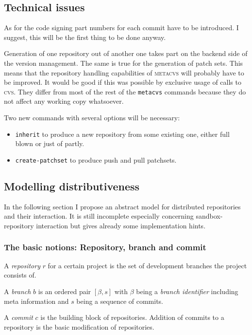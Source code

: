 \documentclass[fleqn, 10pt, a4paper]{article}
\begin{document}
\subsection{Technical issues}

As for the code signing part numbers for each commit have
to be introduced. I suggest, this will be the first thing to be done anyway.

Generation of one repository out of another one takes part on the backend
side of the version management. The same is true for the generation
of patch sets. This means that the repository handling capabilities of
\textsc{metacvs} will probably have to be improved. It would be good if
this was possible by exclusive usage of calls to \textsc{cvs}.
They differ from most of the rest of the \texttt{metacvs} commands
because they do not affect any working copy whatsoever.

Two new commands with several options will be necessary:
\begin{itemize}
\item \texttt{inherit} to produce a new repository from some existing one,
either full blown or just of partly.
\item \texttt{create-patchset} to produce push and pull patchsets.
\end{itemize}

\subsection{Modelling distributiveness}

In the following section I propose an abstract model for distributed
repositories and their interaction. It is still incomplete
especially concerning sandbox-repository interaction but gives already
some implementation hints.

\subsubsection{The basic notions: Repository, branch and commit}

A \emph{repository} $r$ for a certain project is the set of development
branches the project consists of.

A \emph{branch} $b$ is an ordered pair $[\beta, s]$ with $\beta$ being
a \emph{branch identifier} including meta information and $s$ being
a sequence of commits.

A \emph{commit} $c$ is the building block of repositories.
Addition of commits to a repository is the basic modification
of repositories.
\end{document}
